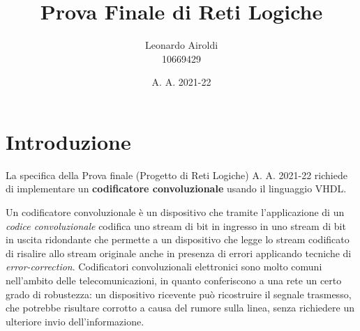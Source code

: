 \documentclass[a4paper]{report}
\title{Prova Finale di Reti Logiche} %
\author{Leonardo Airoldi\\10669429} %
\date{A. A. 2021-22}
\begin{document}

\maketitle %


\tableofcontents
\newpage





\chapter{Introduzione}


La specifica della Prova finale (Progetto di Reti Logiche) A. A. 2021-22 richiede di implementare un \textbf{codificatore convoluzionale} usando il linguaggio VHDL.

Un codificatore convoluzionale è un dispositivo che tramite l'applicazione di un \textit{codice convoluzionale} codifica uno stream di bit in ingresso in uno stream di bit in uscita ridondante che permette a un dispositivo che legge lo stream codificato di risalire allo stream originale anche in presenza di errori applicando tecniche di \textit{error-correction}.
Codificatori convoluzionali elettronici sono molto comuni nell'ambito delle telecomunicazioni, in quanto conferiscono a una rete un certo grado di robustezza: un dispositivo ricevente può ricostruire il segnale trasmesso, che potrebbe risultare corrotto a causa del rumore sulla linea, senza richiedere un ulteriore invio dell'informazione.
\end{document}

